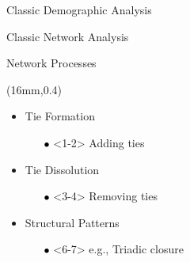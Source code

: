 \documentclass[10pt]{beamer}
\newcommand{\mob}[1]{{\textcolor{black}{#1}}}
\begin{document}
\begin{frame}[t]{Classic Demographic Analysis}
\end{frame}


\begin{frame}[t]{Classic Network Analysis}

\begin{block}{}
\centering
Network Processes
\end{block}


\begin{textblock*}{42mm}(16mm,0.4\textheight)
\begin{block}{}
\begin{itemize}
\item<1-2> Tie Formation
\begin{itemize}
\item[\mob{$\bullet$}]<1-2> Adding ties
\end{itemize}
\item<3-4> Tie Dissolution
\begin{itemize}
\item[\mob{$\bullet$}]<3-4> Removing ties
\end{itemize}
\item<5-7> Structural Patterns
\begin{itemize}
\item[\mob{$\bullet$}]<6-7> e.g., Triadic closure
\end{itemize}
\end{itemize}
\end{block}
\end{textblock*}


\end{frame}
\end{document}
